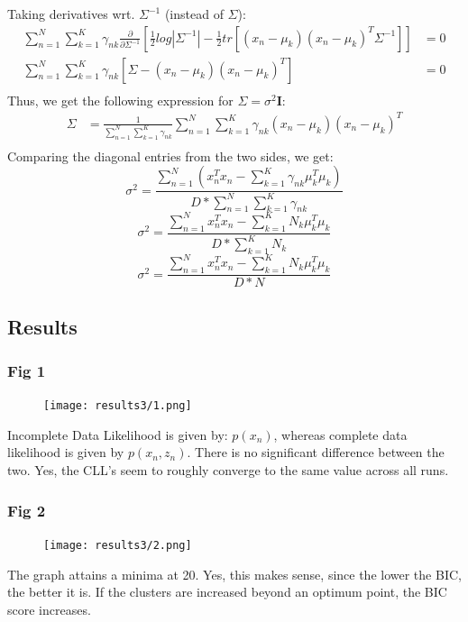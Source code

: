 \documentclass{article}
\begin{document}
Taking derivatives wrt. $\Sigma^{-1}$ (instead of $\Sigma$):
\begin{equation*}
\begin{aligned}
\sum_{n=1}^N\sum_{k=1}^K \gamma_{nk}\frac{\partial}{\partial \Sigma^{-1}}[ \frac{1}{2}log|\Sigma^{-1}| - \frac{1}{2}tr[(x_n- \mu_k)(x_n-\mu_k)^T\Sigma^{-1}]] &= 0\\
\sum_{n=1}^N\sum_{k=1}^K \gamma_{nk} [\Sigma - (x_n- \mu_k)(x_n-\mu_k)^T ] &=0 \\
\end{aligned}
\end{equation*}
Thus, we get the following expression for $\Sigma = \sigma^2\textbf{I}$:
\begin{equation*}
\begin{aligned}
\Sigma &= \frac{1}{\sum_{n=1}^N\sum_{k=1}^K \gamma_{nk}} \sum_{n=1}^N\sum_{k=1}^K \gamma_{nk}(x_n- \mu_k)(x_n-\mu_k)^T \\
\end{aligned}
\end{equation*}
Comparing the diagonal entries from the two sides, we get:
$$\sigma^2 = \frac{\sum_{n=1}^N (x_n^Tx_n - \sum_{k=1}^K \gamma_{nk}\mu_k^T\mu_k)}{D*\sum_{n=1}^N\sum_{k=1}^K \gamma_{nk}}$$
$$\sigma^2 = \frac{\sum_{n=1}^N x_n^Tx_n - \sum_{k=1}^KN_{k}\mu_k^T\mu_k}{D*\sum_{k=1}^K N_{k}}$$
$$\sigma^2 = \frac{\sum_{n=1}^N x_n^Tx_n - \sum_{k=1}^KN_{k}\mu_k^T\mu_k}{D*N}$$
\newpage
\subsection{Results}
\subsubsection{Fig 1}
\begin{figure}[h!]
\centering
\texttt{[image: results3/1.png]}
\label{1}
\end{figure}
Incomplete Data Likelihood is given by: $p(x_n)$, whereas complete data likelihood is given by $p(x_n,z_n)$. There is no significant difference between the two. Yes, the CLL's seem to roughly converge to the same value across all runs.
\subsubsection{Fig 2}
\begin{figure}[h!]
\centering
\texttt{[image: results3/2.png]}
\label{2}
\end{figure}
The graph attains a minima at 20. Yes, this makes sense, since the lower the BIC, the better it is. If the clusters are increased beyond an optimum point, the BIC score increases.
\end{document}
